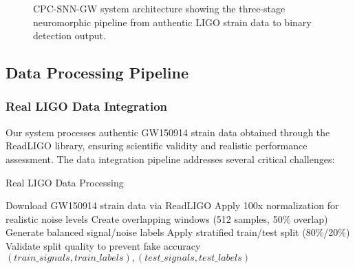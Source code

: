 \documentclass[12pt,a4paper]{article}
\begin{document}
\begin{figure}[H]
\centering
{}
\caption{CPC-SNN-GW system architecture showing the three-stage neuromorphic pipeline from authentic LIGO strain data to binary detection output.}
\label{fig:architecture}
\end{figure}

\subsection{Data Processing Pipeline}

\subsubsection{Real LIGO Data Integration}

Our system processes authentic GW150914 strain data obtained through the ReadLIGO library, ensuring scientific validity and realistic performance assessment. The data integration pipeline addresses several critical challenges:

\begin{algorithm}[H]
\caption{Real LIGO Data Processing}
\begin{algorithmic}[1]
\STATE Download GW150914 strain data via ReadLIGO
\STATE Apply 100x normalization for realistic noise levels
\STATE Create overlapping windows (512 samples, 50\% overlap)
\STATE Generate balanced signal/noise labels
\STATE Apply stratified train/test split (80\%/20\%)
\STATE Validate split quality to prevent fake accuracy
\RETURN $(train\_signals, train\_labels), (test\_signals, test\_labels)$
\end{algorithmic}
\end{algorithm}
\end{document}
